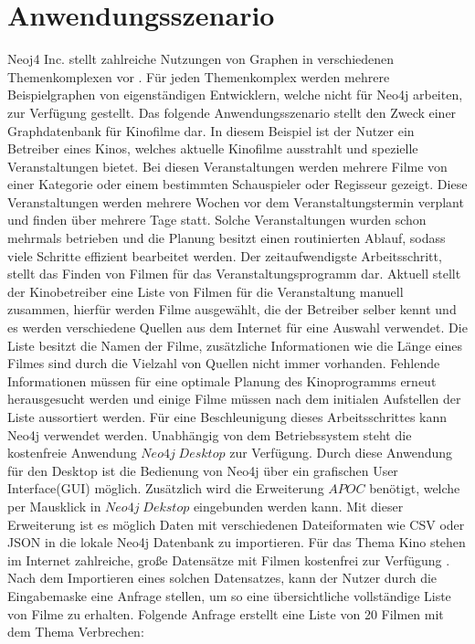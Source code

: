 \section{Anwendungsszenario}
Neoj4 Inc. stellt zahlreiche Nutzungen von Graphen in verschiedenen Themenkomplexen vor \parencite{Examples}. Für jeden Themenkomplex werden mehrere Beispielgraphen von eigenständigen Entwicklern, welche nicht für Neo4j arbeiten, zur Verfügung gestellt. Das folgende Anwendungsszenario stellt den Zweck einer Graphdatenbank für Kinofilme dar.\newline
In diesem Beispiel ist der Nutzer ein Betreiber eines Kinos, welches aktuelle Kinofilme ausstrahlt und spezielle Veranstaltungen bietet. Bei diesen Veranstaltungen werden mehrere Filme von einer Kategorie oder einem bestimmten Schauspieler oder Regisseur gezeigt. Diese Veranstaltungen werden mehrere Wochen vor dem Veranstaltungstermin verplant und finden über mehrere Tage statt. Solche Veranstaltungen wurden schon mehrmals betrieben und die Planung besitzt einen routinierten Ablauf, sodass viele Schritte effizient bearbeitet werden. Der zeitaufwendigste Arbeitsschritt, stellt das Finden von Filmen für das Veranstaltungsprogramm dar. \newline
Aktuell stellt der Kinobetreiber eine Liste von Filmen für die Veranstaltung manuell zusammen, hierfür werden Filme ausgewählt, die der Betreiber selber kennt und es werden verschiedene Quellen aus dem Internet für eine Auswahl verwendet. Die Liste besitzt die Namen der Filme, zusätzliche Informationen wie die Länge eines Filmes sind durch die Vielzahl von Quellen nicht immer vorhanden. Fehlende Informationen müssen für eine optimale Planung des Kinoprogramms erneut herausgesucht werden und einige Filme müssen nach dem initialen Aufstellen der Liste  aussortiert werden. \newline  
Für eine Beschleunigung dieses Arbeitsschrittes kann Neo4j verwendet werden. Unabhängig von dem Betriebssystem steht die kostenfreie Anwendung $Neo4j\; Desktop$ zur Verfügung. Durch diese Anwendung für den Desktop ist die Bedienung von Neo4j über ein grafischen User Interface(GUI) möglich. Zusätzlich wird die Erweiterung $APOC$ benötigt, welche per Mausklick in $Neo4j\; Dekstop$ eingebunden werden kann. Mit dieser Erweiterung ist es möglich Daten mit verschiedenen Dateiformaten wie CSV oder JSON in die lokale Neo4j Datenbank zu importieren. Für das Thema Kino stehen im Internet zahlreiche, große Datensätze mit Filmen kostenfrei zur Verfügung \parencite{Kaggle}. Nach dem Importieren eines solchen Datensatzes, kann der Nutzer durch die Eingabemaske eine Anfrage stellen, um so eine übersichtliche vollständige Liste von Filme zu erhalten. Folgende Anfrage erstellt eine Liste von 20 Filmen mit dem Thema Verbrechen: 
